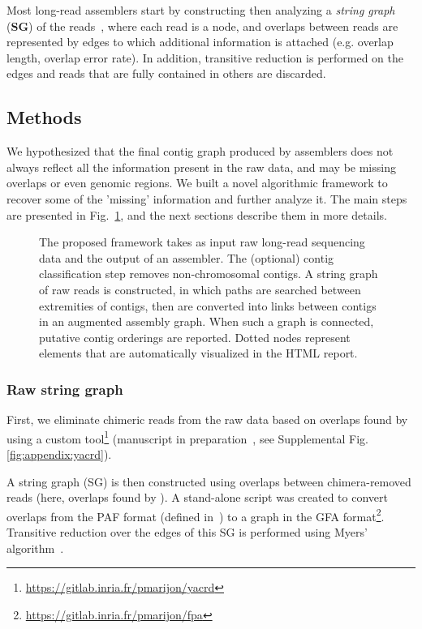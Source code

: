 \documentclass[./main.tex]{subfiles}
\newcommand{\modafterreview}[1]{#1}
\begin{document}
Most long-read assemblers \modafterreview{start by constructing then analyzing} a \emph{string graph} (\textbf{SG}) of the reads~\citep{myers2005fragment}, where each read is a node, and overlaps between reads are represented by edges to which additional information is attached (e.g. overlap length, overlap error rate). In addition, transitive reduction is performed on the edges and reads \modafterreview{that are fully contained in others} are discarded.

\subsection{Methods}

We hypothesized that the final contig graph produced by assemblers does not always reflect all the information present in the raw data, and may be missing overlaps or \modafterreview{even} genomic regions.
We built a novel \modafterreview{algorithmic} framework to recover some of the 'missing' information and further analyze it. The main steps are presented in Fig.~\ref{fg:framework_presentation}, and the next sections describe them in more details. 


\begin{figure}[!tpb]
    \centering
    
    \caption{The proposed framework takes as input raw long-read sequencing data and the output of an assembler. The \modafterreview{(optional)} contig classification step removes non-chromosomal contigs. A string graph of raw reads is constructed, in which paths are searched between extremities of contigs, then are converted into links between contigs in an augmented assembly graph. When such a graph is connected, putative contig orderings are reported. \modafterreview{Dotted nodes represent elements that are automatically visualized in the HTML report.}}
    \label{fg:framework_presentation}
\end{figure}

\subsubsection{Raw string graph}

First, we eliminate chimeric reads from the raw data based on overlaps found by \minimap using a custom tool\footnote{\small \url{https://gitlab.inria.fr/pmarijon/yacrd}} (manuscript in preparation~\citep{yacrd}, see Supplemental Fig. \ref{fig:appendix:yacrd}).
\modafterreview{
A string graph (SG) is then constructed using overlaps between \modafterreview{chimera-removed} reads \modafterreview{(here, overlaps found by \minimap)}.%
} %
A stand-alone script was created to convert overlaps from the PAF format (defined in~\cite{miniasm}) to a graph in the GFA format\footnote{\small \url{https://gitlab.inria.fr/pmarijon/fpa}}. 
Transitive reduction over the edges of this SG is performed using Myers' algorithm~\citep{myers2005fragment}.
\end{document}

